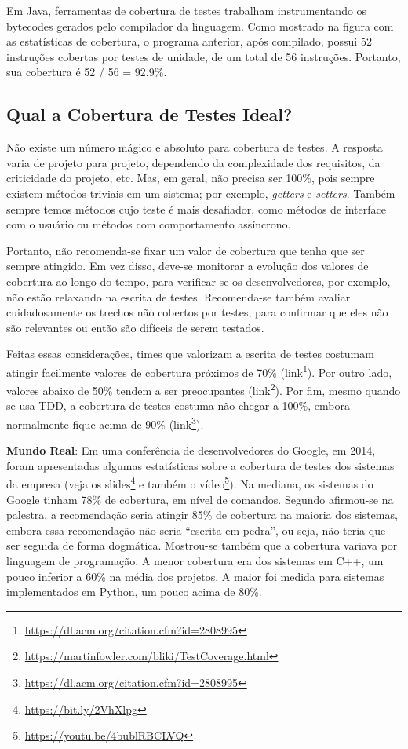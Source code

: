 \documentclass[
  11pt,
  twoside]{book}
\DeclareRobustCommand{\href}[2]{#2\footnote{\url{#1}}}
\newenvironment{esmbox}{\centering \vspace{1.5ex} \begin{tcolorbox}[breakable, colback=backcolor, width=4.9in]}{\end{tcolorbox} \vspace{1.5ex}}
\begin{document}
Em Java, ferramentas de cobertura de testes trabalham instrumentando os
bytecodes gerados pelo compilador da linguagem. Como mostrado na figura
com as estatísticas de cobertura, o programa anterior, após compilado,
possui 52 instruções cobertas por testes de unidade, de um total de 56
instruções. Portanto, sua cobertura é 52 / 56 = 92.9\%.

\hypertarget{qual-a-cobertura-de-testes-ideal}{%
\subsection{Qual a Cobertura de Testes
Ideal?}\label{qual-a-cobertura-de-testes-ideal}}

Não existe um número mágico e absoluto para cobertura de testes. A
resposta varia de projeto para projeto, dependendo da complexidade dos
requisitos, da criticidade do projeto, etc. Mas, em geral, não precisa
ser 100\%, pois sempre existem métodos triviais em um sistema; por
exemplo, \emph{getters} e \emph{setters}. Também sempre temos métodos
cujo teste é mais desafiador, como métodos de interface com o usuário ou
métodos com comportamento assíncrono.

Portanto, não recomenda-se fixar um valor de cobertura que tenha que ser
sempre atingido. Em vez disso, deve-se monitorar a evolução dos valores
de cobertura ao longo do tempo, para verificar se os desenvolvedores,
por exemplo, não estão relaxando na escrita de testes. Recomenda-se
também avaliar cuidadosamente os trechos não cobertos por testes, para
confirmar que eles não são relevantes ou então são difíceis de serem
testados.

Feitas essas considerações, times que valorizam a escrita de testes
costumam atingir facilmente valores de cobertura próximos de 70\%
(\href{https://dl.acm.org/citation.cfm?id=2808995}{link}). Por outro
lado, valores abaixo de 50\% tendem a ser preocupantes
(\href{https://martinfowler.com/bliki/TestCoverage.html}{link}). Por
fim, mesmo quando se usa TDD, a cobertura de testes costuma não chegar a
100\%, embora normalmente fique acima de 90\%
(\href{https://dl.acm.org/citation.cfm?id=2808995}{link}).


\begin{esmbox}

\textbf{Mundo Real}: Em uma conferência de desenvolvedores do Google, em
2014, foram apresentadas algumas estatísticas sobre a cobertura de
testes dos sistemas da empresa (veja os
\href{https://bit.ly/2VhXlpg}{slides} e também o
\href{https://youtu.be/4bublRBCLVQ}{vídeo}). Na mediana, os sistemas do
Google tinham 78\% de cobertura, em nível de comandos. Segundo
afirmou-se na palestra, a recomendação seria atingir 85\% de cobertura
na maioria dos sistemas, embora essa recomendação não seria ``escrita em
pedra'', ou seja, não teria que ser seguida de forma dogmática.
Mostrou-se também que a cobertura variava por linguagem de programação.
A menor cobertura era dos sistemas em C++, um pouco inferior a 60\% na
média dos projetos. A maior foi medida para sistemas implementados em
Python, um pouco acima de 80\%.

\end{esmbox}
\end{document}
